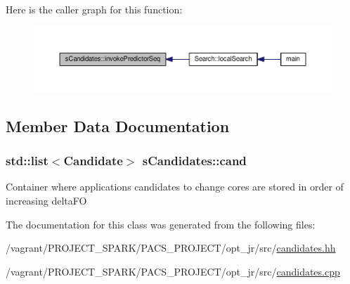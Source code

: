 Here is the caller graph for this function\-:\nopagebreak
\begin{figure}[H]
\begin{center}
\leavevmode
\includegraphics[width=350pt]{classsCandidates_a79ab5675418a37532bf447cfa8baf975_icgraph}
\end{center}
\end{figure}




\subsection{Member Data Documentation}
\hypertarget{classsCandidates_a71334f188ac386cd5958508288487832}{
\subsubsection[{cand}]{\setlength{\rightskip}{0pt plus 5cm}std\-::list$<${\bf Candidate}$>$ s\-Candidates\-::cand}}\label{classsCandidates_a71334f188ac386cd5958508288487832}
Container where applications candidates to change cores are stored in order of increasing delta\-F\-O 

The documentation for this class was generated from the following files\-:\begin{DoxyCompactItemize}
\item 
/vagrant/\-P\-R\-O\-J\-E\-C\-T\-\_\-\-S\-P\-A\-R\-K/\-P\-A\-C\-S\-\_\-\-P\-R\-O\-J\-E\-C\-T/opt\-\_\-jr/src/\hyperlink{candidates_8hh}{candidates.\-hh}\item 
/vagrant/\-P\-R\-O\-J\-E\-C\-T\-\_\-\-S\-P\-A\-R\-K/\-P\-A\-C\-S\-\_\-\-P\-R\-O\-J\-E\-C\-T/opt\-\_\-jr/src/\hyperlink{candidates_8cpp}{candidates.\-cpp}\end{DoxyCompactItemize}

